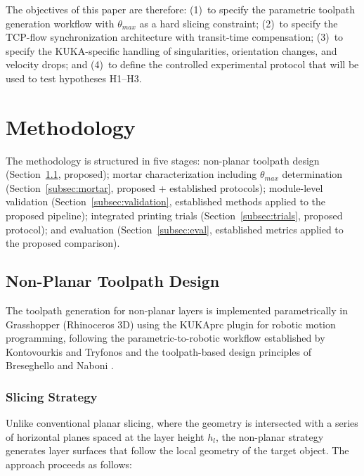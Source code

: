 \documentclass[conference]{IEEEtran}
\begin{document}
The objectives of this paper are therefore: (1)~to specify the parametric toolpath generation workflow with $\theta_{max}$ as a hard slicing constraint; (2)~to specify the TCP-flow synchronization architecture with transit-time compensation; (3)~to specify the KUKA-specific handling of singularities, orientation changes, and velocity drops; and (4)~to define the controlled experimental protocol that will be used to test hypotheses H1--H3.

\section{Methodology}

The methodology is structured in five stages: non-planar toolpath design (Section~\ref{subsec:toolpath}, proposed); mortar characterization including $\theta_{max}$ determination (Section~\ref{subsec:mortar}, proposed + established protocols); module-level validation (Section~\ref{subsec:validation}, established methods applied to the proposed pipeline); integrated printing trials (Section~\ref{subsec:trials}, proposed protocol); and evaluation (Section~\ref{subsec:eval}, established metrics applied to the proposed comparison).

\subsection{Non-Planar Toolpath Design}
\label{subsec:toolpath}

The toolpath generation for non-planar layers is implemented parametrically in Grasshopper (Rhinoceros 3D) using the KUKA\textbar prc plugin for robotic motion programming, following the parametric-to-robotic workflow established by Kontovourkis and Tryfonos \cite{kontovourkis_integrating_2018} and the toolpath-based design principles of Breseghello and Naboni \cite{breseghello_toolpath-based_2022}.

\subsubsection{Slicing Strategy}

Unlike conventional planar slicing, where the geometry is intersected with a series of horizontal planes spaced at the layer height $h_l$, the non-planar strategy generates layer surfaces that follow the local geometry of the target object. The approach proceeds as follows:
\end{document}
